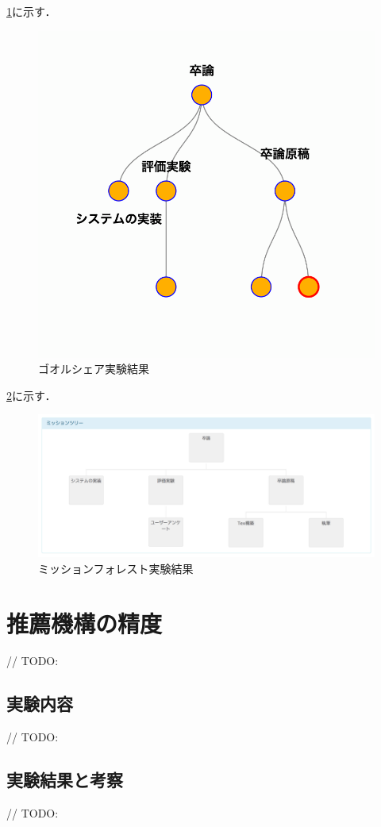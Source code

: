 \ref{img:experiment_goalshare}に示す．

\begin{figure}[t]
	\begin{center}
		\includegraphics[width=0.9\linewidth]{assets/img/experiment_goalshare.png}
		\caption{ゴオルシェア実験結果}
		\label{img:experiment_goalshare}
	\end{center}
\end{figure}

\ref{img:experiment_missionforest}に示す．

\begin{figure}[t]
	\begin{center}
		\includegraphics[width=0.9\linewidth]{assets/img/experiment_missionforest.png}
		\caption{ミッションフォレスト実験結果}
		\label{img:experiment_missionforest}
	\end{center}
\end{figure}

\section{推薦機構の精度}
// TODO:

\subsection{実験内容}
// TODO:

\subsection{実験結果と考察}
// TODO:
